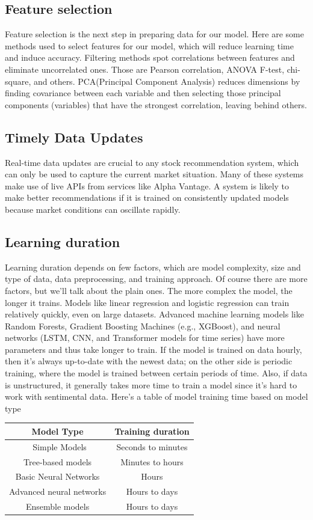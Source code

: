 \documentclass[10pt,twoside,english,a4paper]{article}
\begin{document}
\subsection{Feature selection}
Feature selection is the next step in preparing data for our model. Here are some methods used to select features for our model, which will reduce learning time and induce accuracy.
Filtering methods spot correlations between features and eliminate uncorrelated ones. Those are Pearson correlation, ANOVA F-test, chi-square, and others. PCA(Principal Component Analysis) reduces dimensions by finding covariance between each variable and then selecting those principal components (variables) that have the strongest correlation, leaving behind others.
\cite{data_preproc_feature_sel_time_updates}
\subsection{Timely Data Updates}
Real-time data updates are crucial to any stock recommendation system, which can only be used to capture the current market situation. Many of these systems make use of live APIs from services like Alpha Vantage. A system is likely to make better recommendations if it is trained on consistently updated models because market conditions can oscillate rapidly.\cite{up-to-date_data}
\subsection{Learning duration}
Learning duration depends on few factors, which are model complexity, size and type of data, data preprocessing, and training approach. Of course there are more factors, but we'll talk about the plain ones. The more complex the model, the longer it trains. Models like linear regression and logistic regression can train relatively quickly, even on large datasets. Advanced machine learning models like Random Forests, Gradient Boosting Machines (e.g., XGBoost), and neural networks (LSTM, CNN, and Transformer models for time series) have more parameters and thus take longer to train. If the model is trained on data hourly, then it's always up-to-date with the newest data; on the other side is periodic training, where the model is trained between certain periods of time. Also, if data is unstructured, it generally takes more time to train a model since it's hard to work with sentimental data.
Here's a table of model training time based on model type
\begin{center}
\begin{tabular}{|c | c|} 
 \hline
 Model Type & Training duration\\ [1ex] 
 \hline\
 Simple Models & Seconds to minutes \\ [1ex] 
 \hline
 Tree-based models& Minutes to hours\\ [1ex]
 \hline
 Basic Neural Networks & Hours\\ [1ex]
 \hline
 Advanced neural networks & Hours to days\\ [1ex] 
 \hline
 Ensemble models & Hours to days\\ [1ex]
 \hline
\end{tabular}
\end{center}\cite{train_t}
\end{document}
